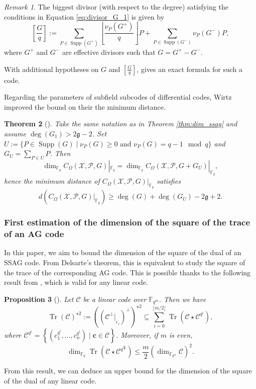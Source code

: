 \documentclass[a4paper]{amsart}
\newtheorem{thm}{Theorem}[section]
\newtheorem{proposition}[thm]{Proposition}
\theoremstyle{definition}
\theoremstyle{remark}
\newtheorem{remark}[thm]{Remark}
\newcommand{\calP}{\mathcal{P}}
\newcommand{\calC}{\mathcal{C}}
\newcommand{\calX}{\mathcal{X}}
\newcommand{\fqm}{\mathbb{F}_{q^m}}
\newcommand{\fq}{\mathbb{F}_{q}}
\newcommand{\Tr}[1]{\operatorname{Tr}\left(#1\right)}
\newcommand{\set}[1]{\left\{#1\right\}}
\newcommand{\Supp}{\operatorname{Supp}}
\begin{document}
\begin{remark}\label{rk:G/q}
	The biggest divisor (with respect to the degree) satisfying the conditions in Equation \eqref{eq:divisor_G_1} is given by 
	\begin{equation}\label{eq:G/q}
		\left[ \frac{G}{q} \right]:= \sum\limits_{P \in \Supp(G^+)} \left\lfloor\frac{\nu_P(G^+)}{q}\right\rfloor P + \sum\limits_{P \in \Supp(G^-)}\nu_P(G^-)P,
	\end{equation}
	where $G^+$ and $G^-$ are effective divisors such that $G=G^+-G^-$.
\end{remark}

With additional hypotheses on $G$ and $\displaystyle \left[ \frac{G}{q} \right]$, {\cite[Theorem~1]{Le16}} gives an exact formula for such a code.

Regarding the parameters of subfield subcodes of differential codes, Wirtz \cite{W88} improved the bound on their the minimum distance.

\begin{thm}[{\cite[Theorem~2]{W88}}]\label{thm:Wirtz}
	Take the same notation as in Theorem \ref{thm:dim_ssag} and assume $\deg (G_1) > 2 \mathfrak{g}-2$.
	Set $U:=\{P \in \Supp(G) \mid \nu_P(G) \geq 0 \text{ and } \nu_P(G) = q-1 \mod q\}$ and $G_U=\sum_{P \in U} P$. Then
	\[	\dim_{\fq} C_{\Omega}(\calX,\calP,G)|_{\fq} = 	\dim_{\fq} C_{\Omega}(\calX,\calP,G+G_U)|_{\fq}, \]
	hence the minimum distance of $C_{\Omega}(\calX,\calP,G)|_{\fq}$ satisfies
	\[d\left(C_{\Omega}(\calX,\calP,G)|_{\fq} \right) \geq \deg (G) + \deg (G_U) -2\mathfrak{g}+2.\]
\end{thm}


\subsubsection{First estimation of the dimension of the square of the trace of an AG code}

In this paper, we aim to bound the dimension of the square of the dual of an SSAG code. From Delsarte's theorem, this is equivalent to study the square of the trace of the corresponding AG code. 
This is possible thanks to the following result from \cite{MT21}, which is valid for any linear code.

\begin{proposition}[{\cite[Proposition~15]{MT21}}] \label{prop:Tr_BoundSchurSquare}
 Let $\calC$ be a linear code over $\fqm$. Then we have 
 \begin{equation} \label{eq:key_equation} \Tr{\calC}^{\star2} := ((\calC^{\perp}|_{_{{\mathbb{F}_q}}})^{\perp})^{\star2} \subseteq \sum\limits_{i=0}^{\lfloor{m/2} \rfloor} \Tr{\calC\star \calC^{q^i}},
 \end{equation}
where $\calC^{q^i}=\set{\left(c_1^{q^i},\dots,c_n^{q^i}\right) \mid \mathbf{c} \in \calC}$.
Moreover, if $m$ is even, 
 \begin{equation} \label{eq:dim_m/2} \dim_{\fq} \Tr{\calC\star \calC^{q^{\frac{m}{2}}}} \leq \frac{m}{2} (\dim_{\fqm}\calC)^2.
\end{equation}
\end{proposition}
From this result, we can deduce an upper bound for the dimension of the square of the dual of any linear code.
\end{document}
